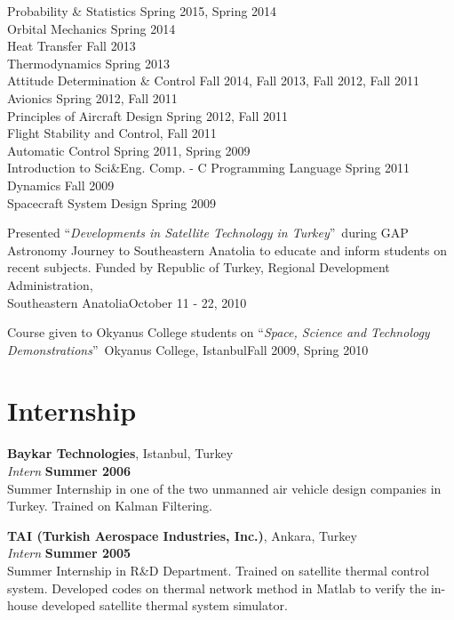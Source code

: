 \documentclass[margin,line]{res}
\begin{document}
\begin{resume}
Probability  \& Statistics  \hfill {Spring 2015, Spring 2014}\\
Orbital Mechanics  \hfill {Spring 2014}\\
Heat Transfer \hfill {Fall 2013}\\
Thermodynamics \hfill {Spring 2013}\\
Attitude Determination  \& Control  \hfill {Fall 2014, Fall 2013, Fall 2012, Fall 2011}\\
Avionics \hfill {Spring 2012, Fall 2011}\\
Principles of Aircraft Design \hfill {Spring 2012, Fall 2011}\\
Flight Stability and Control, \hfill {Fall 2011}\\
Automatic Control \hfill {Spring 2011, Spring 2009}\\
Introduction to Sci\&Eng. Comp. -  C Programming Language \hfill {Spring 2011}\\
Dynamics \hfill {Fall 2009}\\
Spacecraft System Design \hfill {Spring 2009}\\
\vspace*{-.20in}

Presented \textquotedblleft  \emph{Developments in Satellite Technology in Turkey}\textquotedblright\, during GAP Astronomy Journey to Southeastern Anatolia to educate and inform students on recent subjects. Funded by Republic of Turkey, Regional Development Administration, \\Southeastern Anatolia\hfill {October 11 - 22, 2010}
\vspace*{-.05in}

Course given to Okyanus College students on  \textquotedblleft  \emph{Space, Science and Technology Demonstrations}\textquotedblright\, Okyanus College, Istanbul\hfill {Fall 2009, Spring 2010}
\vspace*{-.05in}

\section{\sc Internship}

{\bf Baykar Technologies}, Istanbul, Turkey\\
{\em Intern} \hfill {\bf Summer 2006}\\
Summer Internship in one of the two unmanned air vehicle design companies in Turkey. Trained on Kalman Filtering.

{\bf TAI (Turkish Aerospace Industries, Inc.)}, Ankara, Turkey\\
{\em Intern} \hfill {\bf Summer 2005}\\
Summer Internship in R\&D Department.
Trained on satellite thermal control system. Developed codes on thermal network method in Matlab to verify the in-house developed satellite thermal system simulator.


\end{resume}
\end{document}
